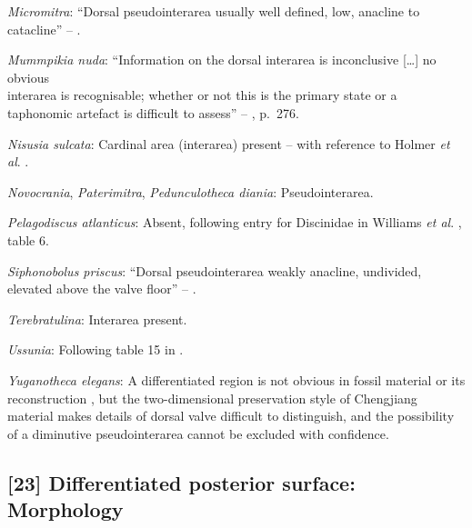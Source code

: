 \documentclass[openany]{book}
\theoremstyle{definition}
\theoremstyle{definition}
\theoremstyle{definition}
\theoremstyle{remark}
\begin{document}
\hypertarget{Micromitra-coding-22}{}
\emph{Micromitra}: ``Dorsal pseudointerarea usually well defined, low,
anacline to catacline'' --
\citet{Williams2000LinguliformeaCraniiformea}.

\hypertarget{Mummpikia_nuda-coding-22}{}
\emph{Mummpikia nuda}: ``Information on the dorsal interarea is
inconclusive {[}\ldots{}{]} no obvious\\
interarea is recognisable; whether or not this is the primary state or a
taphonomic artefact is difficult to assess'' --
\citet{Balthasar2008iMummpikia}, p.~276.

\hypertarget{Nisusia_sulcata-coding-22}{}
\emph{Nisusia sulcata}: Cardinal area (interarea) present -- with
reference to Holmer \emph{et al}.
\citeyearpar{Holmer2018Evolutionarysignificance}.

\hypertarget{Novocrania-coding-22}{}
\emph{Novocrania}, \emph{Paterimitra}, \emph{Pedunculotheca diania}:
Pseudointerarea.

\hypertarget{Pelagodiscus_atlanticus-coding-22}{}
\emph{Pelagodiscus atlanticus}: Absent, following entry for Discinidae
in Williams \emph{et al}.
\citeyearpar{Williams2000LinguliformeaCraniiformea}, table 6.

\hypertarget{Siphonobolus_priscus-coding-22}{}
\emph{Siphonobolus priscus}: ``Dorsal pseudointerarea weakly anacline,
undivided, elevated above the valve floor'' --
\citet{Popov2009Earlyontogeny}.

\hypertarget{Terebratulina-coding-22}{}
\emph{Terebratulina}: Interarea present.

\hypertarget{Ussunia-coding-22}{}
\emph{Ussunia}: Following table 15 in
\citet{Williams2000LinguliformeaCraniiformea}.

\hypertarget{Yuganotheca_elegans-coding-22}{}
\emph{Yuganotheca elegans}: A differentiated region is not obvious in
fossil material or its reconstruction \citep{Zhang2014Anearly}, but the
two-dimensional preservation style of Chengjiang material makes details
of dorsal valve difficult to distinguish, and the possibility of a
diminutive pseudointerarea cannot be excluded with confidence.

\subsection*{{[}23{]} Differentiated posterior surface:
Morphology}\label{differentiated-posterior-surface-morphology}
\end{document}

